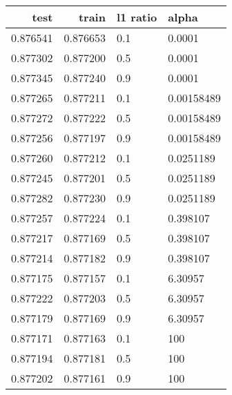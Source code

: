 \begin{tabular}{rrll}
\toprule
     test &     train & l1 ratio &       alpha \\
\midrule
 0.876541 &  0.876653 &      0.1 &      0.0001 \\
 0.877302 &  0.877200 &      0.5 &      0.0001 \\
 0.877345 &  0.877240 &      0.9 &      0.0001 \\
 0.877265 &  0.877211 &      0.1 &  0.00158489 \\
 0.877272 &  0.877222 &      0.5 &  0.00158489 \\
 0.877256 &  0.877197 &      0.9 &  0.00158489 \\
 0.877260 &  0.877212 &      0.1 &   0.0251189 \\
 0.877245 &  0.877201 &      0.5 &   0.0251189 \\
 0.877282 &  0.877230 &      0.9 &   0.0251189 \\
 0.877257 &  0.877224 &      0.1 &    0.398107 \\
 0.877217 &  0.877169 &      0.5 &    0.398107 \\
 0.877214 &  0.877182 &      0.9 &    0.398107 \\
 0.877175 &  0.877157 &      0.1 &     6.30957 \\
 0.877222 &  0.877203 &      0.5 &     6.30957 \\
 0.877179 &  0.877169 &      0.9 &     6.30957 \\
 0.877171 &  0.877163 &      0.1 &         100 \\
 0.877194 &  0.877181 &      0.5 &         100 \\
 0.877202 &  0.877161 &      0.9 &         100 \\
\bottomrule
\end{tabular}
